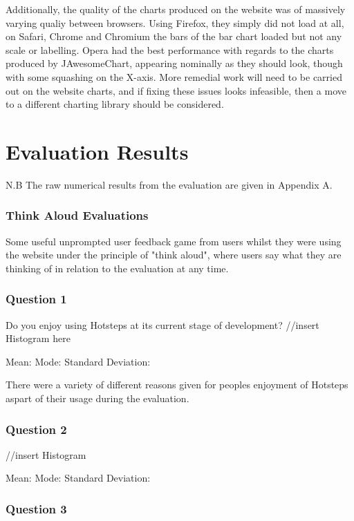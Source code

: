 \documentclass{l4proj}
\begin{document}
Additionally, the quality of the charts produced on the website was of massively varying qualiy between browsers. Using Firefox, they simply did not load at all, on Safari, Chrome and Chromium the bars of the bar chart loaded but not any scale or labelling. Opera had the best performance with regards to the charts produced by JAwesomeChart, appearing nominally as they should look, though with some squashing on the X-axis. More remedial work will need to be carried out on the website charts, and if fixing these issues looks infeasible, then a move to a different charting library should be considered.

\section{Evaluation Results}

N.B The raw numerical results from the evaluation are given in Appendix A.

\subsubsection{Think Aloud Evaluations}

Some useful unprompted user feedback game from users whilst they were using the website under the principle of "think aloud", where users say what they are thinking of in relation to the evaluation at any time. 

\subsubsection{Question 1}

Do you enjoy using Hotsteps at its current stage of development?
//insert Histogram here

Mean:
Mode: 
Standard Deviation: 

There were a variety of different reasons given for peoples enjoyment of Hotsteps aspart of their usage during the evaluation. 

\subsubsection{Question 2}

//insert Histogram 

Mean:
Mode:
Standard Deviation:

\subsubsection{Question 3}
\end{document}
